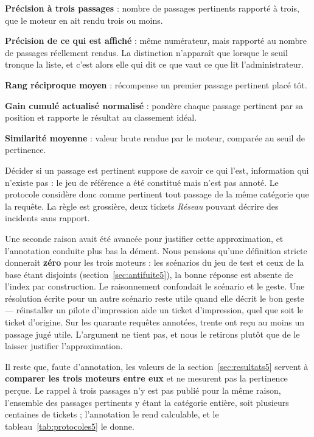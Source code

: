\begin{puces}
  \item \textbf{Précision à trois passages} : nombre de passages pertinents rapporté à trois,
        que le moteur en ait rendu trois ou moins.
  \item \textbf{Précision de ce qui est affiché} : même numérateur, mais rapporté au nombre de
        passages réellement rendus. La distinction n'apparaît que lorsque le seuil tronque la
        liste, et c'est alors elle qui dit ce que vaut ce que lit l'administrateur.
  \item \textbf{Rang réciproque moyen} : récompense un premier passage pertinent placé tôt.
  \item \textbf{Gain cumulé actualisé normalisé} : pondère chaque passage pertinent par sa position
        et rapporte le résultat au classement idéal.
  \item \textbf{Similarité moyenne} : valeur brute rendue par le moteur, comparée au seuil de
        pertinence.
\end{puces}

Décider si un passage est pertinent suppose de savoir ce qui l'est, information qui n'existe pas :
le jeu de référence a été constitué mais n'est pas
annoté. Le protocole considère donc comme pertinent tout passage de la même catégorie que la
requête. La règle est grossière, deux tickets \emph{Réseau}
pouvant décrire des incidents sans rapport.

Une seconde raison avait été avancée pour justifier cette approximation, et l'annotation conduite
plus bas la dément. Nous pensions qu'une définition stricte donnerait \textbf{zéro} pour les trois
moteurs : les scénarios du jeu de test et ceux de la base étant disjoints
(section~\ref{sec:antifuite5}), la bonne réponse est absente de l'index par construction. Le
raisonnement confondait le scénario et le geste. Une résolution écrite pour un autre scénario reste
utile quand elle décrit le bon geste — réinstaller un pilote d'impression aide un ticket
d'impression, quel que soit le ticket d'origine. Sur les quarante requêtes annotées, trente ont
reçu au moins un passage jugé utile. L'argument ne tient pas, et nous le retirons plutôt que de le
laisser justifier l'approximation.

Il reste que, faute d'annotation, les valeurs de la section~\ref{sec:resultats5} servent à
\textbf{comparer les trois moteurs entre eux} et ne mesurent pas la pertinence perçue. Le rappel à
trois passages n'y est pas publié pour la même raison, l'ensemble des passages pertinents y étant
la catégorie entière, soit plusieurs centaines de tickets ; l'annotation le rend calculable, et le
tableau~\ref{tab:protocoles5} le donne.

